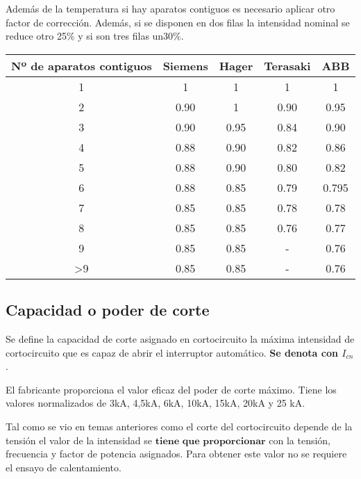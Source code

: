 Además de la temperatura si hay aparatos contiguos es necesario aplicar otro factor de corrección. Además, si se disponen en dos filas la intensidad nominal se reduce otro 25\% y si son tres filas un30\%.
\begin{table}[H]
	\centering
	\begin{tabular}{|c|c|c|c|c|}
		\hline
		\textbf{Nº de aparatos contiguos} & \textbf{Siemens} & \textbf{Hager} & \textbf{Terasaki} & \textbf{ABB} \\ \hline
		1  & 1    & 1    & 1    & 1    \\ \hline
		2  & 0.90 & 1    & 0.90 & 0.95 \\ \hline
		3  & 0.90 & 0.95 & 0.84 & 0.90 \\ \hline
		4  & 0.88 & 0.90 & 0.82 & 0.86 \\ \hline
		5  & 0.88 & 0.90 & 0.80 & 0.82 \\ \hline
		6  & 0.88 & 0.85 & 0.79 & 0.795 \\ \hline
		7  & 0.85 & 0.85 & 0.78 & 0.78  \\ \hline
		8  & 0.85 & 0.85 & 0.76 & 0.77  \\ \hline
		9  & 0.85 & 0.85 & -    & 0.76  \\ \hline
		>9 & 0.85 & 0.85 & -    & 0.76  \\ \hline
	\end{tabular}
\end{table}



\subsection{Capacidad o poder de corte}
Se define la capacidad de corte asignado en cortocircuito la máxima intensidad de cortocircuito que es capaz de abrir el interruptor automático. \textbf{Se denota con $I_{cn}$}.
\newline

El fabricante proporciona el valor eficaz del poder de corte máximo. Tiene los valores normalizados de 3kA, 4,5kA, 6kA, 10kA, 15kA, 20kA y 25 kA.
\newline

Tal como se vio en temas anteriores como el corte del cortocircuito depende de la tensión el valor de la intensidad se $\textbf{tiene que proporcionar}$ con la tensión, frecuencia y factor de potencia asignados. Para obtener este valor no se requiere el ensayo de calentamiento.
\newline

